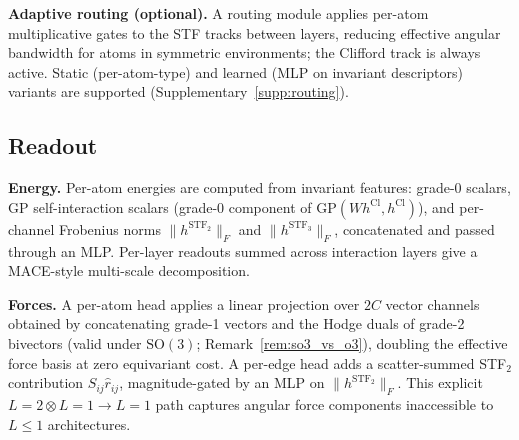 \textbf{Adaptive routing (optional).} A routing module applies per-atom multiplicative gates to the STF tracks between layers, reducing effective angular bandwidth for atoms in symmetric environments; the Clifford track is always active. Static (per-atom-type) and learned (MLP on invariant descriptors) variants are supported (Supplementary~\ref{supp:routing}).

\subsection{Readout}\label{sec:readout}

\textbf{Energy.} Per-atom energies are computed from invariant features: grade-0 scalars, GP self-interaction scalars (grade-0 component of $\mathrm{GP}(W h^{\mathrm{Cl}}, h^{\mathrm{Cl}})$), and per-channel Frobenius norms $\lVert h^{\mathrm{STF}_2}\rVert_F$ and $\lVert h^{\mathrm{STF}_3}\rVert_F$, concatenated and passed through an MLP. Per-layer readouts summed across interaction layers give a MACE-style multi-scale decomposition.

\textbf{Forces.} A per-atom head applies a linear projection over $2C$ vector channels obtained by concatenating grade-1 vectors and the Hodge duals of grade-2 bivectors (valid under $\mathrm{SO}(3)$; Remark~\ref{rem:so3_vs_o3}), doubling the effective force basis at zero equivariant cost. A per-edge head adds a scatter-summed STF$_2$ contribution $S_{ij}\hat{r}_{ij}$, magnitude-gated by an MLP on $\lVert h^{\mathrm{STF}_2}\rVert_F$. This explicit $L{=}2 \otimes L{=}1 \to L{=}1$ path captures angular force components inaccessible to $L \leq 1$ architectures.